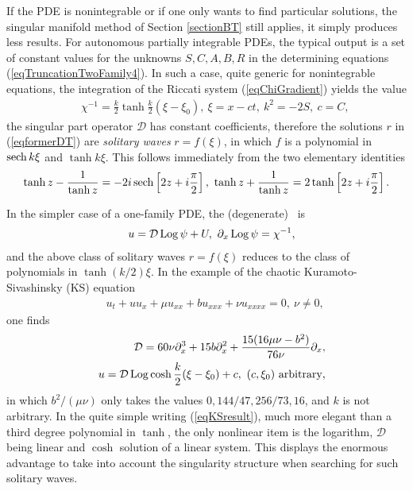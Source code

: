 \documentclass[10pt]{article}
\begin{document}
If the PDE is nonintegrable or if one only wants to find particular solutions,
the singular manifold method of Section \ref{sectionBT} still applies,
it simply produces less results.
For autonomous partially integrable PDEs,
the typical output is a set of constant values for the unknowns
$S,C,A,B,R$ in the determining equations (\ref{eqTruncationTwoFamily4}).
In such a case,
quite generic for nonintegrable equations, 
the integration of the Riccati system (\ref{eqChiGradient})
yields the value
\begin{eqnarray}
& &
\chi^{-1}=\frac{k}{2} \tanh \frac{k}{2} (\xi-\xi_0),\
\xi=x-ct,\ k^2=-2 S,\ c=C,
\end{eqnarray}
the singular part operator $\mathcal{D}$ has constant coefficients,
therefore the solutions $r$ in (\ref{eqformerDT}) 
are
\textit{solitary waves} $r=f(\xi)$,
in which $f$ is a polynomial
in $\mathop{\rm sech}\nolimits k \xi$ and $\tanh k \xi$.
This follows immediately from 
the two elementary identities \cite{CM1993}
\begin{equation}
   \tanh z - \frac{1}{\tanh z}= -2 i \mathop{\rm sech}\nolimits\left[2 z + i \frac{\pi}{2}\right],\
   \tanh z + \frac{1}{\tanh z}=  2   \tanh\left[2 z + i \frac{\pi}{2}\right].
\label{eqIdentitiestanhsech}
\end{equation}

In the simpler case of a one-family PDE, 
the (degenerate) \formerDT\ is
\begin{eqnarray}
& &
u={\mathcal D} \mathop{\rm Log}\nolimits \psi + U,\
\partial_x \mathop{\rm Log}\nolimits \psi=\chi^{-1},
\end{eqnarray}
and the above class of solitary waves $r=f(\xi)$ reduces to the class of
polynomials in $\tanh (k/2) \xi$.
In the example of the chaotic Kuramoto-Sivashinsky (KS) equation
\index{Kuramoto-Sivashinsky equation}
\begin{eqnarray}
& &
u_t + u u_x + \mu u_{xx} + b u_{xxx} + \nu u_{xxxx}=0,\ \nu \not=0,
\label{eqKS}
\end{eqnarray}
one finds \cite{KudryashovKSFourb} 
\begin{eqnarray}
& &
\mathcal{D}=60 \nu \partial_x^3 + 15 b \partial_x^2
           + \frac{15(16 \mu \nu - b^2)}{76 \nu} \partial_x,
\label{eqKSD}
\\
& &
u=\mathcal{D} \Log \cosh \frac{k}{2} (\xi-\xi_0) + c,\ 
(c,\xi_0) \hbox{ arbitrary},
\label{eqKSresult}
\end{eqnarray}
in which $b^2/(\mu \nu)$ only takes the values $0,144/47,256/73,16$,
and $k$ is not arbitrary.
In the quite simple writing (\ref{eqKSresult}),
much more elegant than a third degree polynomial in $\tanh$,
the only nonlinear item is the logarithm,
$\mathcal{D}$ being linear and $\cosh$ solution of a linear system.
This displays the enormous advantage to take into account the
singularity structure when searching for such solitary waves.
\end{document}
